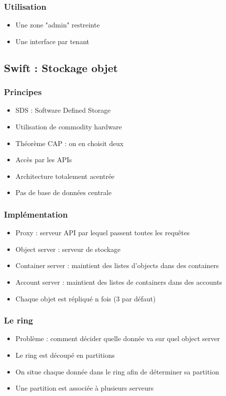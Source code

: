   \begin{frame}
    \frametitle{Utilisation}
    \begin{itemize}
      \item Une zone "admin" restreinte
      \item Une interface par tenant
    \end{itemize}
  \end{frame}

  \subsection[Swift]{Swift : Stockage objet}

  \begin{frame}
    \frametitle{Principes}
    \begin{itemize}
      \item SDS : Software Defined Storage
      \item Utilisation de commodity hardware
      \item Théorème CAP : on en choisit deux
      \item Accès par les APIs
      \item Architecture totalement acentrée
      \item Pas de base de données centrale
    \end{itemize}
  \end{frame}

  \begin{frame}
    \frametitle{Implémentation}
    \begin{itemize}
      \item Proxy : serveur API par lequel passent toutes les requêtes
      \item Object server : serveur de stockage
      \item Container server : maintient des listes d'objects dans des containers
      \item Account server : maintient des listes de containers dans des accounts
      \item Chaque objet est répliqué n fois (3 par défaut)
    \end{itemize}
  \end{frame}

  \begin{frame}
    \frametitle{Le ring}
    \begin{itemize}
      \item Problème : comment décider quelle donnée va sur quel object server
      \item Le ring est découpé en partitions
      \item On situe chaque donnée dans le ring afin de déterminer sa partition
      \item Une partition est associée à plusieurs serveurs
    \end{itemize}
  \end{frame}

